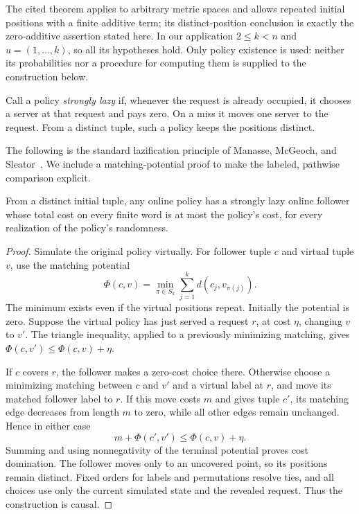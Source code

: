 The cited theorem applies to arbitrary metric spaces and allows repeated
initial positions with a finite additive term; its distinct-position
conclusion is exactly the zero-additive assertion stated here. In our
application $2\le k<n$ and $u=(1,\ldots,k)$, so all its hypotheses hold.
Only policy existence is used: neither its probabilities nor a procedure
for computing them is supplied to the construction below.

Call a policy \emph{strongly lazy} if, whenever the request is already
occupied, it chooses a server at that request and pays zero. On a miss
it moves one server to the request. From a distinct tuple, such a policy
keeps the positions distinct.

The following is the standard lazification principle of Manasse, McGeoch,
and Sleator~\cite[Lemma~1]{MMS1990}. We include a matching-potential proof
to make the labeled, pathwise comparison explicit.

\begin{lemma}\label{lem:lazy}
From a distinct initial tuple, any online policy has a strongly lazy
online follower whose total cost on every finite word is at most the
policy's cost, for every realization of the policy's randomness.
\end{lemma}

\begin{proof}
Simulate the original policy virtually. For follower tuple $c$ and
virtual tuple $v$, use the matching potential
\[
 \Phi(c,v)=\min_{\pi\in S_k}\sum_{j=1}^k d(c_j,v_{\pi(j)}).
\]
The minimum exists even if the virtual positions repeat. Initially the
potential is zero. Suppose the virtual policy has just served a request
$r$, at cost $\eta$, changing $v$ to $v'$. The triangle inequality,
applied to a previously minimizing matching, gives
$\Phi(c,v')\le\Phi(c,v)+\eta$.

If $c$ covers $r$, the follower makes a zero-cost choice there. Otherwise
choose a minimizing matching between $c$ and $v'$ and a virtual label
at $r$, and move its matched follower label to $r$. If this move costs
$m$ and gives tuple $c'$, its matching edge decreases from length $m$
to zero, while all other edges remain unchanged. Hence in either case
\[
 m+\Phi(c',v')\le\Phi(c,v)+\eta.
\]
Summing and using nonnegativity of the terminal potential proves cost
domination. The follower moves only to an uncovered point, so its
positions remain distinct. Fixed orders for labels and permutations
resolve ties, and all choices use only the current simulated state and
the revealed request. Thus the construction is causal.
\end{proof}

